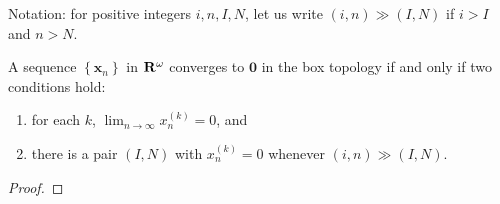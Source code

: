 \newpage
\begin{problem}
Notation: for positive integers $i,n,I,N$, let us write
$(i,n)\gg(I,N)$ if $i>I$ and $n>N$.
\begin{theorem}
A sequence $\left\{\mathbf{x}_n\right\}$ in $\mathbf{R}^\omega$
converges to $\mathbf{0}$ in the box topology if and only if two
conditions hold:
\begin{enumerate}[noitemsep,label=(\roman*)]
\item for each $k$, $\lim_{n\to\infty} x_n^{(k)}=0$, and
\item there is a pair $(I,N)$ with $x_n^{(k)}=0$ whenever
  $(i,n)\gg(I,N)$.
\end{enumerate}
\end{theorem}
\end{problem}
\begin{proof}
\end{proof}

